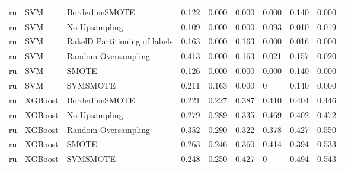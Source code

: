 \begin{tabular}{lllllllll}
      ru &                             SVM &               BorderlineSMOTE & 0.122 &                     0.000 &                 0.000 &                  0.000 &                                   0.140 &     0.000 \\
      ru &                             SVM &                 No Upsampling & 0.109 &                     0.000 &                 0.000 &                  0.093 &                                   0.010 &     0.019 \\
      ru &                             SVM & RakelD Partitioning of labels & 0.163 &                     0.000 &                 0.163 &                  0.000 &                                   0.016 &     0.000 \\
      ru &                             SVM &           Random Oversampling & 0.413 &                     0.000 &                 0.163 &                  0.021 &                                   0.157 &     0.020 \\
      ru &                             SVM &                         SMOTE & 0.126 &                     0.000 &                 0.000 &                  0.000 &                                   0.140 &     0.000 \\
      ru &                             SVM &                      SVMSMOTE & 0.211 &                     0.163 &                 0.000 &                      0 &                                   0.140 &     0.000 \\
      ru &                         XGBoost &               BorderlineSMOTE & 0.221 &                     0.227 &                 0.387 &                  0.410 &                                   0.404 &     0.446 \\
      ru &                         XGBoost &                 No Upsampling & 0.279 &                     0.289 &                 0.335 &                  0.469 &                                   0.402 &     0.472 \\
      ru &                         XGBoost &           Random Oversampling & 0.352 &                     0.290 &                 0.322 &                  0.378 &                                   0.427 &     0.550 \\
      ru &                         XGBoost &                         SMOTE & 0.263 &                     0.246 &                 0.360 &                  0.414 &                                   0.394 &     0.533 \\
      ru &                         XGBoost &                      SVMSMOTE & 0.248 &                     0.250 &                 0.427 &                      0 &                                   0.494 &     0.543 \\
\bottomrule
\end{tabular}
